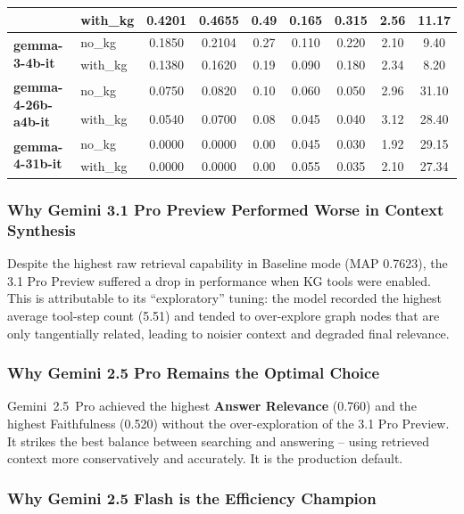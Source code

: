 \documentclass[11pt, a4paper]{article}
\begin{document}
\begin{table}[H]
{\begin{tabular}{llccccccc}
        & with\_kg & 0.4201 & 0.4655 & 0.49 & 0.165 & 0.315 & 2.56 & 11.17\\
        \midrule
        \multirow{2}{*}{\textbf{gemma-3-4b-it}}
        & no\_kg   & 0.1850 & 0.2104 & 0.27 & 0.110 & 0.220 & 2.10 & 9.40\\
        & with\_kg & 0.1380 & 0.1620 & 0.19 & 0.090 & 0.180 & 2.34 & 8.20\\
        \midrule
        \multirow{2}{*}{\textbf{gemma-4-26b-a4b-it}}
        & no\_kg   & 0.0750 & 0.0820 & 0.10 & 0.060 & 0.050 & 2.96 & 31.10\\
        & with\_kg & 0.0540 & 0.0700 & 0.08 & 0.045 & 0.040 & 3.12 & 28.40\\
        \midrule
        \multirow{2}{*}{\textbf{gemma-4-31b-it}}
        & no\_kg   & 0.0000 & 0.0000 & 0.00 & 0.045 & 0.030 & 1.92 & 29.15\\
        & with\_kg & 0.0000 & 0.0000 & 0.00 & 0.055 & 0.035 & 2.10 & 27.34\\
        \bottomrule
    \end{tabular}}
\end{table}

\subsubsection{Why Gemini 3.1 Pro Preview Performed Worse in Context Synthesis}

Despite the highest raw retrieval capability in Baseline mode (MAP 0.7623), the 3.1 Pro Preview suffered a drop in performance when KG tools were enabled. This is attributable to its ``exploratory'' tuning: the model recorded the highest average tool-step count (5.51) and tended to over-explore graph nodes that are only tangentially related, leading to noisier context and degraded final relevance.

\subsubsection{Why Gemini 2.5 Pro Remains the Optimal Choice}

Gemini~2.5~Pro achieved the highest \textbf{Answer Relevance} (0.760) and the highest Faithfulness (0.520) without the over-exploration of the 3.1 Pro Preview. It strikes the best balance between searching and answering -- using retrieved context more conservatively and accurately. It is the production default.

\subsubsection{Why Gemini 2.5 Flash is the Efficiency Champion}
\end{document}
